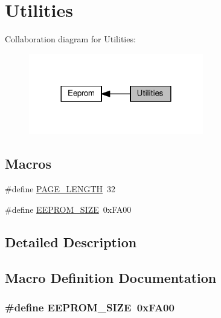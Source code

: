 \hypertarget{group___utilities}{}\section{Utilities}
\label{group___utilities}
Collaboration diagram for Utilities\+:\nopagebreak
\begin{figure}[H]
\begin{center}
\leavevmode
\includegraphics[width=216pt]{db/deb/group___utilities}
\end{center}
\end{figure}
\subsection*{Macros}
\begin{DoxyCompactItemize}
\item 
\#define \hyperlink{group___utilities_gaa583f25d8bd438def94d50dff97b468d}{P\+A\+G\+E\+\_\+\+L\+E\+N\+G\+TH}~32
\item 
\#define \hyperlink{group___utilities_gae3ef7bba113f663df6996f286b632a3f}{E\+E\+P\+R\+O\+M\+\_\+\+S\+I\+ZE}~0x\+F\+A00
\end{DoxyCompactItemize}


\subsection{Detailed Description}


\subsection{Macro Definition Documentation}
\subsubsection[{\texorpdfstring{E\+E\+P\+R\+O\+M\+\_\+\+S\+I\+ZE}{EEPROM_SIZE}}]{\setlength{\rightskip}{0pt plus 5cm}\#define E\+E\+P\+R\+O\+M\+\_\+\+S\+I\+ZE~0x\+F\+A00}\hypertarget{group___utilities_gae3ef7bba113f663df6996f286b632a3f}{}\label{group___utilities_gae3ef7bba113f663df6996f286b632a3f}


